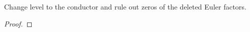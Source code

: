\begin{theorem}
\label{primZero}
\leanok
Change level to the conductor and rule out zeros of the deleted Euler factors.
\end{theorem}
\begin{proof}
\leanok
\end{proof}
